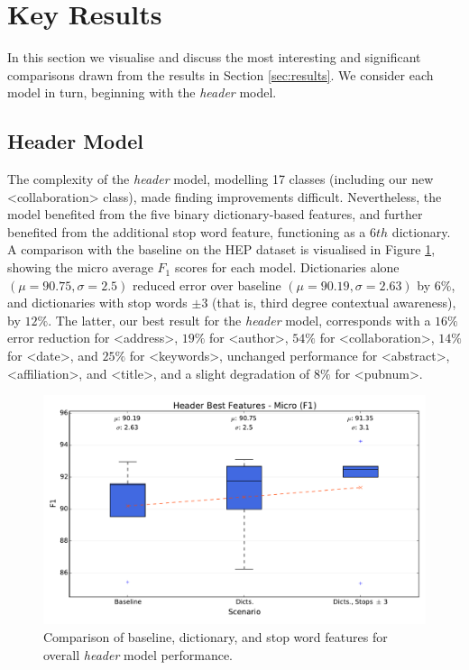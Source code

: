 \section{Key Results}
\label{sec:keyresults}

In this section we visualise and discuss the most interesting and significant comparisons drawn from the results in Section \ref{sec:results}. We consider each model in turn, beginning with the \emph{header} model.

\subsection{Header Model}

The complexity of the \emph{header} model, modelling 17 classes (including our new <collaboration> class), made finding improvements difficult. Nevertheless, the model benefited from the five binary dictionary-based features, and further benefited from the additional stop word feature, functioning as a $6th$ dictionary. A comparison with the baseline on the HEP dataset is visualised in Figure \ref{fig:micro_header}, showing the micro average $F_1$ scores for each model. Dictionaries alone $(\mu = 90.75, \sigma = 2.5)$ reduced error over baseline $(\mu = 90.19, \sigma = 2.63)$ by $6\%$, and dictionaries with stop words $\pm 3$ (that is, third degree contextual awareness), by $12\%$. The latter, our best result for the \emph{header} model, corresponds with a $16\%$ error reduction for <address>, $19\%$ for <author>, $54\%$ for <collaboration>, $14\%$ for <date>, and $25\%$ for <keywords>, unchanged performance for <abstract>, <affiliation>, and <title>, and a slight degradation of $8\%$ for <pubnum>.

\begin{figure}[h]
\center
\includegraphics[width=5.5in]{Figures/micro_header.pdf}
\caption{Comparison of baseline, dictionary, and stop word features for overall \emph{header} model performance.}
\label{fig:micro_header}
\end{figure}

